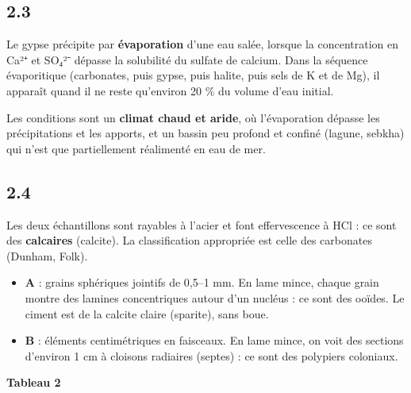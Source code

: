 \documentclass[11pt,a4paper]{article}
\providecommand{\tightlist}{\setlength{\itemsep}{0pt}\setlength{\parskip}{0pt}}
\begin{document}
\hypertarget{section-13}{%
\subsection{2.3}\label{section-13}}

Le gypse précipite par \textbf{évaporation} d'une eau salée, lorsque la concentration en Ca²⁺ et SO₄²⁻ dépasse la solubilité du sulfate de calcium. Dans la séquence évaporitique (carbonates, puis gypse, puis halite, puis sels de K et de Mg), il apparaît quand il ne reste qu'environ 20 \% du volume d'eau initial.

Les conditions sont un \textbf{climat chaud et aride}, où l'évaporation dépasse les précipitations et les apports, et un bassin peu profond et confiné (lagune, sebkha) qui n'est que partiellement réalimenté en eau de mer.

\hypertarget{section-14}{%
\subsection{2.4}\label{section-14}}

Les deux échantillons sont rayables à l'acier et font effervescence à HCl : ce sont des \textbf{calcaires} (calcite). La classification appropriée est celle des carbonates (Dunham, Folk).

\begin{itemize}
\tightlist
\item
  \textbf{A} : grains sphériques jointifs de 0,5--1 mm. En lame mince, chaque grain montre des lamines concentriques autour d'un nucléus : ce sont des ooïdes. Le ciment est de la calcite claire (sparite), sans boue.
\item
  \textbf{B} : éléments centimétriques en faisceaux. En lame mince, on voit des sections d'environ 1 cm à cloisons radiaires (septes) : ce sont des polypiers coloniaux.
\end{itemize}

\textbf{Tableau 2}
\end{document}
